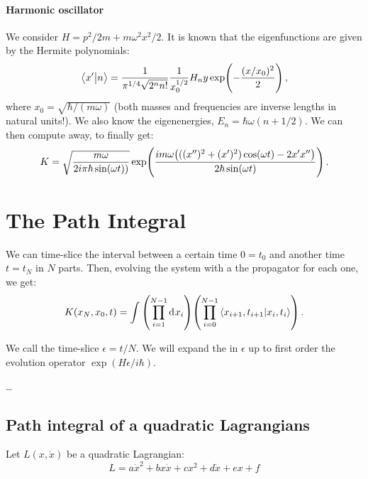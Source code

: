 \documentclass[main.tex]{subfiles}
\begin{document}
\paragraph{Harmonic oscillator}

We consider \(H = p^2/2m + m \omega^2 x^2 / 2\). It is known that the eigenfunctions are given by the Hermite polynomials: 
%
\begin{equation}
  \braket{x'}{n} = \frac{1}{\pi^{1/4} \sqrt{2^{n} n!}} \frac{1}{x_0^{1/2}} H_n y \exp(-\frac{(x/x_0)^2}{2}) 
\,,
\end{equation}
%
where \(x_0 = \sqrt{\hbar / (m \omega )} \) (both masses and frequencies are inverse lengths in natural units!). We also know the eigenenergies, \(E_n = \hbar \omega (n+1/2)\). We can then compute away, to finally get: 
%
\begin{equation}
  K = \sqrt{\frac{m \omega }{2 i \pi \hbar \sin(\omega t))}}
  \exp(\frac{im \omega \qty(((x'')^2+(x')^2)\cos(\omega t)-2x'x'' )}{2 \hbar \sin(\omega t) })  
\,.
\end{equation}
%

\section{The Path Integral}

We can time-slice the interval between a certain time \(0 = t_0\) and another time \(t = t_N\) in \(N\) parts. Then, evolving the system with a the propagator for each one, we get: 
%
\begin{equation}
  K(x_N, x_0, t) = 
  \int \qty(\prod _{i=1}^{N-1} \dd[]{x_i}) \qty(\prod_{i=0}^{N-1}\braket{x_{i+1}, t_{i+1}}{x_i, t_i})  
\,.
\end{equation}

We call the time-slice \(\epsilon = t/N\). We will expand the in \(\epsilon \) up to first order the evolution operator \(\exp(H \epsilon /i \hbar) \).

\dots


\subsection{Path integral of a quadratic Lagrangians}

Let \(L(x,\dot{x})\) be a quadratic Lagrangian:
\begin{equation}
	L = a\dot{x}^2 + bx\dot{x} + cx^2 + d\dot{x} + ex + f
\end{equation}
\end{document}

